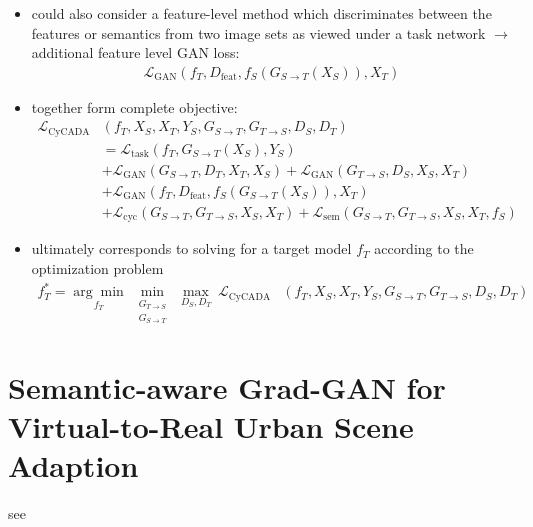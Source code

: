\begin{itemize}
	\item could also consider a feature-level method which discriminates between the features or semantics from two image sets as viewed under a task network $\rightarrow$ additional feature level GAN loss:
	\begin{align}
		\mathcal{L}_{\text{GAN}}(f_T, D_{\text{feat}}, f_S(G_{S\rightarrow T}(X_S)), X_T)
	\end{align}
	\item together form complete objective:
	\begin{align}
		\mathcal{L}_{\text{CyCADA}}&(f_T, X_S, X_T, Y_S, G_{S\rightarrow T}, G_{T\rightarrow S}, D_S, D_T)\\
		&= \mathcal{L}_{\text{task}}(f_T, G_{S\rightarrow T}(X_S), Y_S)\\
		&+ \mathcal{L}_{\text{GAN}}(G_{S\rightarrow T}, D_T, X_T, X_S) + \mathcal{L}_{\text{GAN}}(G_{T\rightarrow S}, D_S, X_S, X_T)\\
		&+ \mathcal{L}_{\text{GAN}}(f_T, D_{\text{feat}}, f_S(G_{S\rightarrow T}(X_S)), X_T)\\
		&+ \mathcal{L}_{\text{cyc}}(G_{S\rightarrow T}, G_{T\rightarrow S}, X_S, X_T) + \mathcal{L}_{\text{sem}}(G_{S\rightarrow T}, G_{T\rightarrow S}, X_S, X_T, f_S)
	\end{align}
	\item ultimately corresponds to solving for a target model $f_T$ according to the optimization problem
	\begin{align}
		f^*_T = \underset{f_T}{\arg\min} ~ \underset{\substack{G_{T\rightarrow S} \\ G_{S\rightarrow T}}}{\min} ~ \underset{D_S, D_T}{\max} ~ \mathcal{L}_{\text{CyCADA}}&(f_T, X_S, X_T, Y_S, G_{S\rightarrow T}, G_{T\rightarrow S}, D_S, D_T)
	\end{align}
\end{itemize}

\newpage

\section{Semantic-aware Grad-GAN for Virtual-to-Real Urban Scene Adaption}

see \cite{DBLP:journals/corr/abs-1801-01726}

